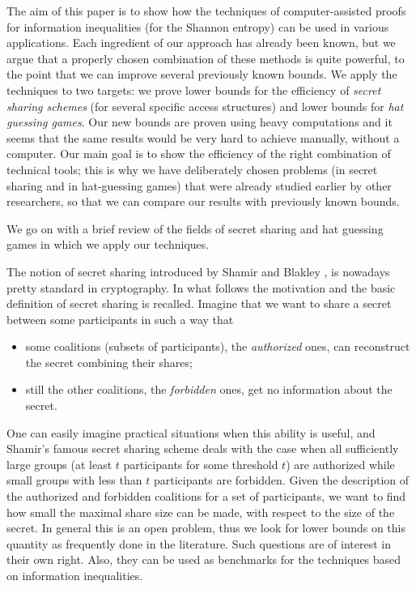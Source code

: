 \documentclass[11pt, a4paper]{kybernetika}
\begin{document}
	The aim of this paper is to show how the techniques of computer-assisted proofs for information inequalities (for the Shannon entropy) can be used in various applications.
	Each ingredient of our approach has already been known, but we argue that a properly chosen combination of these methods is quite powerful, to the point that we can improve several previously known bounds.
	We apply the techniques to two targets: we prove lower bounds for the efficiency of \emph{secret sharing schemes} (for several specific access structures) and lower bounds for \emph{hat guessing games}.
	Our new bounds are proven using heavy computations and it seems that the same results would be very hard to achieve manually, without a computer. Our main goal is to show the efficiency of the right combination of technical tools; this is why we have deliberately chosen problems (in secret sharing and in hat-guessing games) that were already studied earlier by other researchers, so that we can compare our results with previously known bounds.
	
	We go on with a brief review of the fields of secret sharing and hat guessing games in which we apply our techniques.
	
	The notion of secret sharing introduced by Shamir \cite{shamir1979share} and Blakley \cite{blakley1979safeguarding}, is nowadays pretty standard in cryptography. In what follows the motivation and the basic definition of secret sharing is recalled. Imagine that we want to share a secret between some participants in such a way that	
	\begin{itemize}
		\item some coalitions (subsets of participants), the \emph{authorized} ones, can reconstruct the secret combining their shares;
		\item still the other coalitions, the \emph{forbidden} ones, get no information about the secret.
	\end{itemize}
	One can easily imagine practical situations when this ability is useful, and Shamir's famous secret sharing scheme deals with the case when all sufficiently large groups (at least $t$ participants for some threshold $t$) are authorized while small groups with less than $t$ participants are forbidden. Given the description of the authorized and forbidden coalitions for a set of participants, we want to find how small the maximal share size can be made, with respect to the size of the secret. In general this is an open problem, thus we look for lower bounds on this quantity as frequently done in the literature. Such questions are of interest in their own right. Also, they can be used as benchmarks for the techniques based on information inequalities.
	
\end{document}
